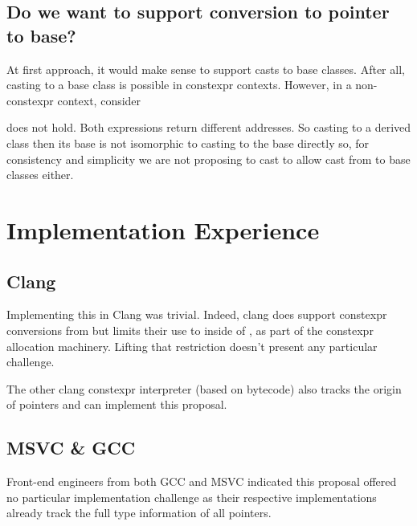 \documentclass{wg21}
\begin{document}
\subsection{Do we want to support conversion to pointer to base?}

At first approach, it would make sense to support casts to base classes.
After all, casting to a base class is possible in constexpr contexts.
However, in a non-constexpr context, consider


 does not hold. Both expressions return different addresses.
So casting to a derived class then its base is not isomorphic to casting to the base directly so, for consistency and simplicity we are not proposing
to cast to allow cast from  to base classes either.

\section{Implementation Experience}

\subsection{Clang}

Implementing this in Clang was trivial. Indeed, clang does support constexpr conversions from  but limits their use to inside of , as part of the constexpr allocation machinery. Lifting that restriction doesn't present any particular challenge.

The other clang constexpr interpreter (based on bytecode) also tracks the origin of pointers and can implement this proposal.

\subsection{MSVC \& GCC}

Front-end engineers from both GCC and MSVC indicated this proposal offered no particular implementation challenge as their respective implementations already track the full type information of all pointers.
\end{document}

